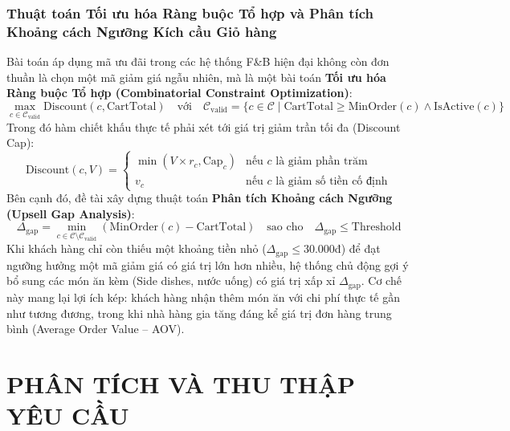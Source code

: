 \documentclass{uetgraduation}
\begin{document}
\subsection{Thuật toán Tối ưu hóa Ràng buộc Tổ hợp và Phân tích Khoảng cách Ngưỡng Kích cầu Giỏ hàng}
Bài toán áp dụng mã ưu đãi trong các hệ thống F\&B hiện đại không còn đơn thuần là chọn một mã giảm giá ngẫu nhiên, mà là một bài toán \textbf{Tối ưu hóa Ràng buộc Tổ hợp (Combinatorial Constraint Optimization)}:
\begin{equation}
\max_{c \in \mathcal{C}_{\text{valid}}} \text{Discount}(c, \text{CartTotal}) \quad \text{với} \quad \mathcal{C}_{\text{valid}} = \{ c \in \mathcal{C} \mid \text{CartTotal} \ge \text{MinOrder}(c) \land \text{IsActive}(c) \}
\end{equation}
Trong đó hàm chiết khấu thực tế phải xét tới giá trị giảm trần tối đa (Discount Cap):
\begin{equation}
\text{Discount}(c, V) = 
\begin{cases} 
\min(V \times r_c, \text{Cap}_c) & \text{nếu } c \text{ là giảm phần trăm} \\
v_c & \text{nếu } c \text{ là giảm số tiền cố định}
\end{cases}
\end{equation}
Bên cạnh đó, đề tài xây dựng thuật toán \textbf{Phân tích Khoảng cách Ngưỡng (Upsell Gap Analysis)}:
\begin{equation}
\Delta_{\text{gap}} = \min_{c \in \mathcal{C} \setminus \mathcal{C}_{\text{valid}}} (\text{MinOrder}(c) - \text{CartTotal}) \quad \text{sao cho} \quad \Delta_{\text{gap}} \le \text{Threshold}
\end{equation}
Khi khách hàng chỉ còn thiếu một khoảng tiền nhỏ ($\Delta_{\text{gap}} \le 30.000$đ) để đạt ngưỡng hưởng một mã giảm giá có giá trị lớn hơn nhiều, hệ thống chủ động gợi ý bổ sung các món ăn kèm (Side dishes, nước uống) có giá trị xấp xỉ $\Delta_{\text{gap}}$. Cơ chế này mang lại lợi ích kép: khách hàng nhận thêm món ăn với chi phí thực tế gần như tương đương, trong khi nhà hàng gia tăng đáng kể giá trị đơn hàng trung bình (Average Order Value -- AOV).


\chapter{PHÂN TÍCH VÀ THU THẬP YÊU CẦU}
\end{document}

